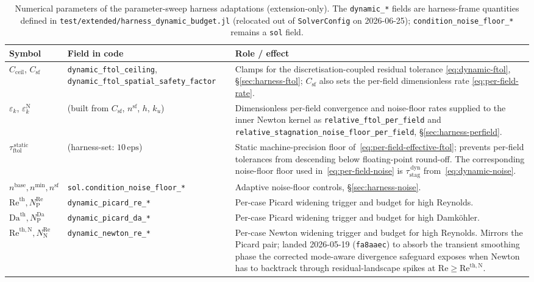 \documentclass{article}
\newcommand{\code}[1]{\texttt{\small #1}}
\newcommand{\textftol}{\tau_{\mathrm{ftol}}}
\newcommand{\textstag}{\tau_{\mathrm{stag}}}
\newcommand{\extline}[1]{{\color{extcolor}#1}}
\begin{document}
\begin{table}[h]
\centering
\caption{\extline{Numerical parameters of the parameter-sweep harness adaptations (extension-only). The \code{dynamic\_*} fields are harness-frame quantities defined in \code{test/extended/harness\_dynamic\_budget.jl} (relocated out of \code{SolverConfig} on 2026-06-25); \code{condition\_noise\_floor\_*} remains a \code{sol} field.}}
\label{tab:harness-params}
\footnotesize
\textcolor{extcolor}{%
\begin{tabularx}{\textwidth}{@{} l l X @{}}
\toprule
\textbf{Symbol} & \textbf{Field in code} & \textbf{Role / effect} \\
\midrule
$C_{\mathrm{ceil}}$, $C_{\mathrm{sf}}$ & \code{dynamic\_ftol\_ceiling}, \code{dynamic\_ftol\_spatial\_safety\_factor} & Clamps for the discretisation-coupled residual tolerance \eqref{eq:dynamic-ftol}, \S\ref{sec:harness-ftol}; $C_{\mathrm{sf}}$ also sets the per-field dimensionless rate \eqref{eq:per-field-rate}. \\
$\varepsilon_{k}$, $\varepsilon^{\mathrm{N}}_{k}$ & (built from $C_{\mathrm{sf}}$, $n^{\mathrm{sf}}$, $h$, $k_u$) & Dimensionless per-field convergence and noise-floor rates supplied to the inner Newton kernel as \code{relative\_ftol\_per\_field} and \code{relative\_stagnation\_noise\_floor\_per\_field}, \S\ref{sec:harness-perfield}. \\
$\textftol^{\,\mathrm{static}}$ & (harness-set: $10\,\mathrm{eps}$) & Static machine-precision floor of~\eqref{eq:per-field-effective-ftol}; prevents per-field tolerances from descending below floating-point round-off. The corresponding noise-floor floor used in~\eqref{eq:per-field-noise} is $\textstag^{\,\mathrm{dyn}}$ from~\eqref{eq:dynamic-noise}. \\
$n^{\mathrm{base}}, n^{\min}, n^{\mathrm{sf}}$ & \code{sol.condition\_noise\_floor\_*} & Adaptive noise-floor controls, \S\ref{sec:harness-noise}. \\
$\mathrm{Re}^{\mathrm{th}}, N_{\mathrm{P}}^{\mathrm{Re}}$ & \code{dynamic\_picard\_re\_*} & Per-case Picard widening trigger and budget for high Reynolds. \\
$\mathrm{Da}^{\mathrm{th}}, N_{\mathrm{P}}^{\mathrm{Da}}$ & \code{dynamic\_picard\_da\_*} & Per-case Picard widening trigger and budget for high Damk\"ohler. \\
$\mathrm{Re}^{\mathrm{th,N}}, N_{\mathrm{N}}^{\mathrm{Re}}$ & \code{dynamic\_newton\_re\_*} & Per-case Newton widening trigger and budget for high Reynolds. Mirrors the Picard pair; landed 2026-05-19 (\code{fa8aaec}) to absorb the transient smoothing phase the corrected mode-aware divergence safeguard exposes when Newton has to backtrack through residual-landscape spikes at $\mathrm{Re} \ge \mathrm{Re}^{\mathrm{th,N}}$. \\
\bottomrule
\end{tabularx}}
\end{table}
\end{document}
